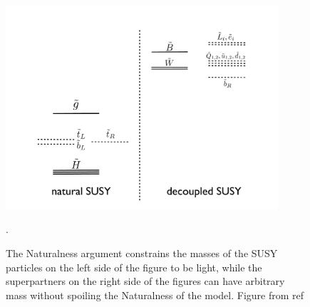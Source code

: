 



\begin{figure}[h!]
\begin{center} 
\includegraphics[width=0.9\textwidth]{figures/theory/NaturalSpec.pdf} 
\end{center}
\caption{The Naturalness argument constrains the masses of the SUSY particles on the left side of the figure to be light, while the superpartners on the right side of the figures can have arbitrary mass without spoiling the Naturalness of the model. Figure from ref \cite{Papucci:2011wy}}.
\label{fig:NaturalSpectrum}
\end{figure}


